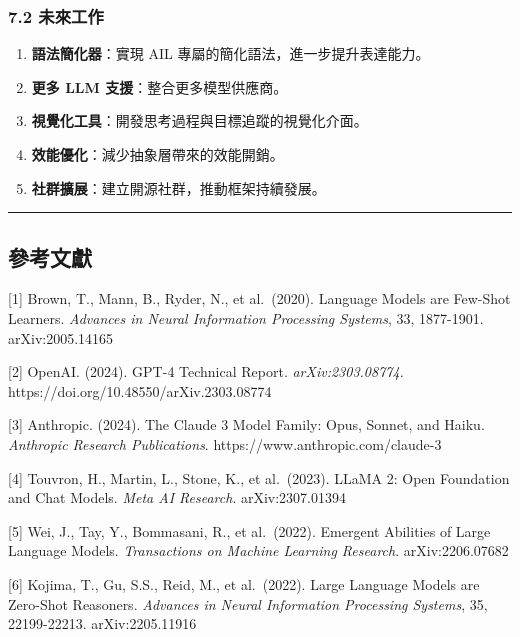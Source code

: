 \subsubsection{7.2 未來工作}\label{ux672aux4f86ux5de5ux4f5c}

\begin{enumerate}
\def\labelenumi{\arabic{enumi}.}
\tightlist
\item
  \textbf{語法簡化器}：實現 AIL 專屬的簡化語法，進一步提升表達能力。
\item
  \textbf{更多 LLM 支援}：整合更多模型供應商。
\item
  \textbf{視覺化工具}：開發思考過程與目標追蹤的視覺化介面。
\item
  \textbf{效能優化}：減少抽象層帶來的效能開銷。
\item
  \textbf{社群擴展}：建立開源社群，推動框架持續發展。
\end{enumerate}

\begin{center}\rule{0.5\linewidth}{0.5pt}\end{center}

\subsection{參考文獻}\label{ux53c3ux8003ux6587ux737b}

{[}1{]} Brown, T., Mann, B., Ryder, N., et al.~(2020). Language Models
are Few-Shot Learners. \emph{Advances in Neural Information Processing
Systems}, 33, 1877-1901. arXiv:2005.14165

{[}2{]} OpenAI. (2024). GPT-4 Technical Report. \emph{arXiv:2303.08774}.
https://doi.org/10.48550/arXiv.2303.08774

{[}3{]} Anthropic. (2024). The Claude 3 Model Family: Opus, Sonnet, and
Haiku. \emph{Anthropic Research Publications}.
https://www.anthropic.com/claude-3

{[}4{]} Touvron, H., Martin, L., Stone, K., et al.~(2023). LLaMA 2: Open
Foundation and Chat Models. \emph{Meta AI Research}. arXiv:2307.01394

{[}5{]} Wei, J., Tay, Y., Bommasani, R., et al.~(2022). Emergent
Abilities of Large Language Models. \emph{Transactions on Machine
Learning Research}. arXiv:2206.07682

{[}6{]} Kojima, T., Gu, S.S., Reid, M., et al.~(2022). Large Language
Models are Zero-Shot Reasoners. \emph{Advances in Neural Information
Processing Systems}, 35, 22199-22213. arXiv:2205.11916

